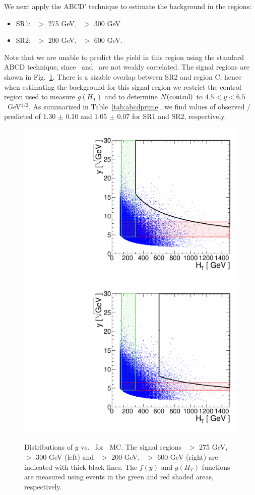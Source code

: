We next apply the ABCD' technique to estimate the background in the regions:

\begin{itemize}
\item SR1: \met\ $>$ 275 GeV, \Ht\ $>$ 300 GeV
\item SR2: \met\ $>$ 200 GeV, \Ht\ $>$ 600 GeV. 
\end{itemize}

Note that we are unable to predict the yield in this region using
the standard ABCD technique, since \met\ and \Ht\ are not weakly correlated. The signal
regions are shown in Fig.~\ref{fig:abcdprime_met}. There is a sizable overlap between
SR2 and region C, hence when estimating the background for this signal region we
restrict the control region used to measure $g(H_T)$ and to determine  $N({\rm control})$ 
to $4.5 < y < 6.5$~GeV$^{1/2}$.
As summarized in Table~\ref{tab:abcdprime}, we find values of observed / predicted of 1.30 $\pm$ 0.10
and 1.05 $\pm$ 0.07 for SR1 and SR2, respectively.

\begin{figure}[hbt]
\begin{center}
\includegraphics[width=0.48\linewidth]{plots/abcdprime_met275_ht300.pdf}
\includegraphics[width=0.48\linewidth]{plots/abcdprime_met200_ht600.pdf}
\caption{\label{fig:abcdprime_met}\protect 
Distributions of $y$ vs. \Ht\ for \ttbar\ MC. The signal regions \met\ $>$ 275 GeV, \Ht\ $>$ 300 GeV (left)
and \met\ $>$ 200 GeV, \Ht\ $>$ 600 GeV (right) are indicated with thick black lines. The $f(y)$ and $g(H_T)$ 
functions are measured using events in the green and red shaded areas, respectively.
}
\end{center}
\end{figure}

